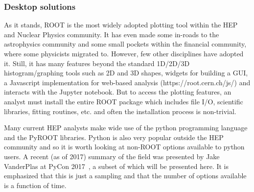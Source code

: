 \documentclass[12pt,a4paper]{article}
\begin{document}
\hypertarget{stats-desktop}{%
\subsubsection{Desktop solutions}\label{stats-desktop}}

As it stands, ROOT is the most widely adopted plotting tool within the HEP and Nuclear Physics community.
It has even made some in-roads to the astrophysics community and some small pockets within the financial community,
where some physicists migrated to. However, few other disciplines have adopted it. Still, it has many features beyond
the standard 1D/2D/3D histogram/graphing tools such as 2D and 3D shapes, widgets for building a GUI, a Javascript
implementation for web-based analysis (https://root.cern.ch/js/) and interacts with the Jupyter notebook. But to
access the plotting features, an analyst must install the entire ROOT package which includes file I/O, scientific
libraries, fitting routines, etc. and often the installation process is non-trivial.

Many current HEP analysts make wide use of the python programming language and the PyROOT libraries.
Python is also very popular outside the HEP community and so it is worth looking at non-ROOT options available to python users.
A recent (as of 2017) summary of the field was presented by Jake VanderPlas at PyCon 2017~\cite{VanderPlas2017}, a subset
of which will be presented here. It is emphasized that this is just a sampling and that the number of options available
is a function of time.
\end{document}
